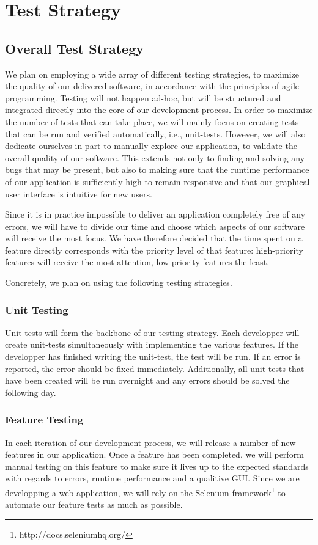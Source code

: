 \documentclass {article}
\begin{document}
\section{Test Strategy}

\subsection{Overall Test Strategy}
We plan on employing a wide array of different testing strategies, to maximize
the quality of our delivered software, in accordance with the principles of
agile programming. Testing will not happen ad-hoc, but will be structured and
integrated directly into the core of our development process.  In order to
maximize the number of tests that can take place, we will mainly focus on
creating tests that can be run and verified automatically, i.e., unit-tests.
However, we will also dedicate ourselves in part to manually explore our
application, to validate the overall quality of our software. This extends not
only to finding and solving any bugs that may be present, but also to making
sure that the runtime performance of our application is sufficiently high to
remain responsive and that our graphical user interface is intuitive for new
users.

Since it is in practice impossible to deliver an application completely free of
any errors, we will have to divide our time and choose which aspects of our
software will receive the most focus. We have therefore decided that the time
spent on a feature directly corresponds with the priority level of that feature:
high-priority features will receive the most attention, low-priority features
the least.

Concretely, we plan on using the following testing strategies.

\subsubsection*{Unit Testing}
Unit-tests will form the backbone of our testing strategy. Each developper will
create unit-tests simultaneously with implementing the various features.  If the
developper has finished writing the unit-test, the test will be run. If an error
is reported, the error should be fixed immediately.  Additionally, all
unit-tests that have been created will be run overnight and any errors should be
solved the following day.

\subsubsection*{Feature Testing}
In each iteration of our development process, we will release a number of new
features in our application. Once a feature has been completed, we will perform
manual testing on this feature to make sure it lives up to the expected
standards with regards to errors, runtime performance and a qualitive GUI.
Since we are developping a web-application, we will rely on the Selenium
framework\footnote{http://docs.seleniumhq.org/} to automate our feature tests as
much as possible.
\end{document}
